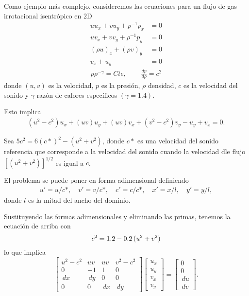 Como ejemplo más complejo, consideremos las ecuaciones para un flujo de gas irrotacional isentrópico en 2D
\begin{align*}
u u_x + v u_y + \rho^{-1} p_x &= 0 \\
u v_x + v v_y + \rho^{-1}p_y &= 0 \\
(\rho u)_x + (\rho v)_y &= 0 \\
v_x + u_y &= 0
\end{align*}
\begin{align*}
p \rho^{-\gamma} = Cte, \qquad \frac{\,dp}{\,d\rho} = c^2
\end{align*}
donde $(u, v)$ es la velocidad, $p$ es la presión, $\rho$ densidad, $c$ es la velocidad del sonido y $\gamma$ razón de calores específicos $(\gamma = 1.4)$.

Esto implica
\begin{align*}
(u^2 - c^2) u_x + (uv)u_y + (uv)v_x + (v^2 - c^2) v_y - u_y + v_x = 0.
\end{align*}

Sea $5c^2 = 6(c*)^2 - (u^2 + v^2)$, donde $c*$ es una velocidad del sonido referencia que corresponde a la velocidad del sonido cuando la velocidad dle flujo $[(u^2 + v^2)]^{1/2}$ es igual a $c$.

El problema se puede poner en forma adimensional definiendo
\begin{align*}
u' = u/c*, \quad v' = v/c*, \quad c' = c/c*, \quad x'=x/l, \quad y'=y/l,
\end{align*}
donde $l$ es la mitad del ancho del dominio.

Sustituyendo las formas adimensionales y eliminando las primas, tenemos la ecuación de arriba con
\begin{align*}
c^2 = 1.2 - 0.2 \thinspace (u^2 + v^2)
\end{align*}
lo que implica
\[
\begin{bmatrix}
u^2 - c^2	&	uv		&	uv	&	v^2-c^2	\\
0		&	-1	&	1	& 0	\\
\,dx		&	\,dy		&	0	&	0	\\
0	&	0	&	\,dx		&	\,dy
\end{bmatrix}
\begin{bmatrix}
u_x	\\	u_y	\\	v_x	\\	v_y 
\end{bmatrix}
=\begin{bmatrix}
0 \\ 0 \\ \,du \\ \,dv
\end{bmatrix}.
\]

